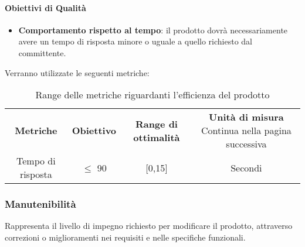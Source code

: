         \paragraph{Obiettivi di Qualità}
        \begin{itemize}
            \item \textbf{Comportamento rispetto al tempo}: il prodotto dovrà necessariamente avere un tempo di risposta minore o uguale a quello richiesto dal committente.
        \end{itemize}
        Verranno utilizzate le seguenti metriche:
        \begin{center}
            \renewcommand{\arraystretch}{2.2}
            
            \begin{longtable}{c c c c }
              
              \rowcolor[HTML]{232f3e}
            
              \rowcolors{1}{tableRow}{}
              \color[HTML]{FFFFFF} \textbf{Metriche} & \color[HTML]{FFFFFF} \centering\textbf{Obiettivo} & \color[HTML]{FFFFFF} \centering\textbf{Range di ottimalità} & \color[HTML]{FFFFFF} \centering\textbf{Unità di misura} 
            \endhead
            \rowcolor{white}\multicolumn{1}{c}
               { Continua nella pagina successiva} \\
               \endfoot
               \caption [Range delle metriche riguardanti l'efficienza del prodotto]{Range delle metriche riguardanti l'efficienza del prodotto}
              \label{tabella:reqP1}
               \endlastfoot

               Tempo di risposta & $\leq$ 90 & [0,15] & Secondi \\

            \end{longtable}

        \end{center}
       
        \subsubsection{Manutenibilità}
        Rappresenta il livello di impegno richiesto per modificare il prodotto, attraverso correzioni o miglioramenti nei requisiti e nelle specifiche funzionali.
